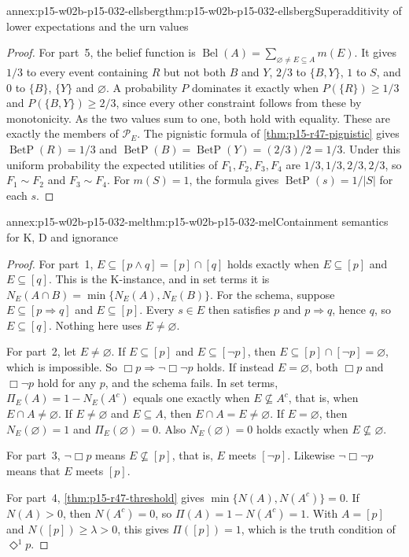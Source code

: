 \begin{annexitem}{annex:p15-w02b-p15-032-ellsberg}{thm:p15-w02b-p15-032-ellsberg}{Superadditivity of lower expectations and the urn values}
\begin{proof}
For part~5, the belief function is
\(\operatorname{Bel}(A)=\sum_{\varnothing\neq E\subseteq A}m(E)\). It
gives \(1/3\) to every event containing \(R\) but not both \(B\) and \(Y\),
\(2/3\) to \(\{B,Y\}\), \(1\) to \(S\), and \(0\) to \(\{B\}\), \(\{Y\}\) and
\(\varnothing\). A probability \(P\) dominates it exactly when
\(P(\{R\})\geq1/3\) and \(P(\{B,Y\})\geq2/3\), since every other constraint
follows from these by monotonicity. As the two values sum to one, both hold
with equality. These are exactly the members of \(\mathcal P_E\). The
pignistic formula of \cref{thm:p15-r47-pignistic} gives
\(\operatorname{BetP}(R)=1/3\) and
\(\operatorname{BetP}(B)=\operatorname{BetP}(Y)=(2/3)/2=1/3\). Under this
uniform probability the expected utilities of \(F_1,F_2,F_3,F_4\) are
\(1/3,1/3,2/3,2/3\), so \(F_1\sim F_2\) and \(F_3\sim F_4\). For \(m(S)=1\),
the formula gives \(\operatorname{BetP}(s)=1/|S|\) for each \(s\).
\end{proof}\end{annexitem}

\begin{annexitem}{annex:p15-w02b-p15-032-mel}{thm:p15-w02b-p15-032-mel}{Containment semantics for K, D and ignorance}
\begin{proof}
For part~1, \(E\subseteq[p\land q]=[p]\cap[q]\) holds exactly when
\(E\subseteq[p]\) and \(E\subseteq[q]\). This is the K-instance, and in set
terms it is \(N_E(A\cap B)=\min\{N_E(A),N_E(B)\}\). For the schema, suppose
\(E\subseteq[p\Rightarrow q]\) and \(E\subseteq[p]\). Every \(s\in E\) then
satisfies \(p\) and \(p\Rightarrow q\), hence \(q\), so \(E\subseteq[q]\).
Nothing here uses \(E\neq\varnothing\).

For part~2, let \(E\neq\varnothing\). If \(E\subseteq[p]\) and
\(E\subseteq[\neg p]\), then \(E\subseteq[p]\cap[\neg p]=\varnothing\),
which is impossible. So \(\Box p\Rightarrow\neg\Box\neg p\) holds. If instead
\(E=\varnothing\), both \(\Box p\) and \(\Box\neg p\) hold for any \(p\), and
the schema fails. In set terms, \(\Pi_E(A)=1-N_E(A^c)\) equals one exactly
when \(E\not\subseteq A^c\), that is, when \(E\cap A\neq\varnothing\). If
\(E\neq\varnothing\) and \(E\subseteq A\), then \(E\cap A=E\neq\varnothing\).
If \(E=\varnothing\), then \(N_E(\varnothing)=1\) and \(\Pi_E(\varnothing)=0\).
Also \(N_E(\varnothing)=0\) holds exactly when \(E\not\subseteq\varnothing\).

For part~3, \(\neg\Box p\) means \(E\not\subseteq[p]\), that is, \(E\) meets
\([\neg p]\). Likewise \(\neg\Box\neg p\) means that \(E\) meets \([p]\).

For part~4, \cref{thm:p15-r47-threshold} gives
\(\min\{N(A),N(A^c)\}=0\). If \(N(A)>0\), then \(N(A^c)=0\), so
\(\Pi(A)=1-N(A^c)=1\). With \(A=[p]\) and \(N([p])\geq\lambda>0\), this gives
\(\Pi([p])=1\), which is the truth condition of \(\Diamond^1p\).
\end{proof}\end{annexitem}


